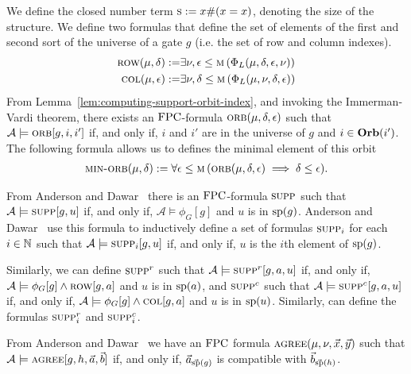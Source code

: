 \documentclass[../paper.tex]{subfiles}
\begin{document}
We define the closed number term $\textsc{s} := x\# (x = x)$, denoting the size of
the structure. We define two formulas that define the set of elements of the
first and second sort of the universe of a gate $g$ (i.e. the set of row and
column indexes).
\begin{align*}
	\textsc{row} (\mu, \delta) :=   & \exists \nu, \epsilon \leq \textsc{m} \, (\Phi_L (\mu, \delta, \epsilon, \nu)) \\
	\textsc{col} (\mu, \epsilon) := & \exists \nu, \delta \leq \textsc{m} \, (\Phi_L (\mu, \nu, \delta , \epsilon))  
\end{align*}
From Lemma~\ref{lem:computing-support-orbit-index}, and invoking the
Immerman-Vardi theorem, there exists an $\text{\upshape FPC}$-formula $\textsc{orb}(\mu, \delta,
\epsilon)$ such that $\mathcal{A} \models \textsc{orb}[g,i, i']$ if, and only if,
$i$ and $i'$ are in the universe of $g$ and $i \in \text{\textbf{Orb}}(i')$. The following
formula allows us to defines the minimal element of this orbit
\begin{align*}
	\textsc{min-orb} (\mu, \delta) := \forall \epsilon \leq \textsc{m} \, (\textsc{orb} (\mu, \delta, \epsilon) \implies \delta \leq \epsilon). 
\end{align*}


From Anderson and Dawar~\cite{AndersonD17} there is an $\text{\upshape FPC}$-formula
$\textsc{supp}$ such that $\mathcal{A} \models \textsc{supp} [g, u]$ if, and only if,
$\mathcal{A} \models \phi_G [g]$ and $u$ is in $\text{sp}(g)$. Anderson and
Dawar~\cite{AndersonD17} use this formula to inductively define a set of
formulas $\textsc{supp}_i$ for each $i \in \mathbb{N}$ such that $\mathcal{A} \models
\textsc{supp}_i[g, u]$ if, and only if, $u$ is the $i$th element of $\text{sp}(g)$.

Similarly, we can define $\textsc{supp}^r$ such that $\mathcal{A} \models
\textsc{supp}^r[g, a, u]$ if, and only if, $\mathcal{A} \models \phi_G [g] \land
\textsc{row}[g, a]$ and $u$ is in $\text{sp}(a)$, and $\textsc{supp}^c$ such that
$\mathcal{A} \models \textsc{supp}^c[g, a, u]$ if, and only if, $\mathcal{A} \models
\phi_G [g] \land \textsc{col}[g, a]$ and $u$ is in $\text{sp}(u)$. Similarly, can
define the formulas $\textsc{supp}^r_i$ and $\textsc{supp}^c_i$.

From Anderson and Dawar~\cite{AndersonD17} we have an $\text{\upshape FPC}$ formula
$\textsc{agree}(\mu, \nu, \vec{x}, \vec{y})$ such that $\mathcal{A} \models
\textsc{agree}[g, h, \vec{a}, \vec{b}]$ if, and only if, $\vec{a}_{\vec{\text{sp}}(g)}$
is compatible with $\vec{b}_{\vec{\text{sp}}(h)}$.
\end{document}
